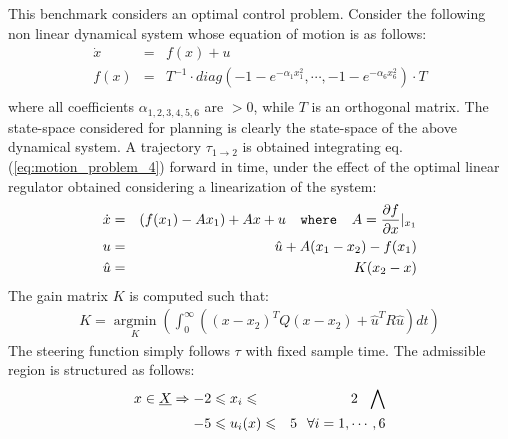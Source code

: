 This benchmark considers an optimal control problem. Consider the following non linear dynamical system whose equation of motion is as follows:
\begin{eqnarray}
\dot{x} &=& f(x) + u \label{eq:motion_problem_4} \\  
f(x) &=& T^{-1} \cdot 
diag(-1-e^{- \alpha_{1} x_1^2}, \cdots, -1-e^{- \alpha_{6} x_6^2})
\cdot T \nonumber\\
\end{eqnarray}
where all coefficients $\alpha_{1,2,3,4,5,6}$ are $>0$, while $T$ is an orthogonal matrix.
The state-space considered for planning is clearly the state-space of the above dynamical system.
A trajectory $\tau_{1 \rightarrow 2}$ is obtained integrating eq. (\ref{eq:motion_problem_4}) forward in time, under the effect of the optimal linear regulator obtained considering a linearization of the system:
\begin{eqnarray}
\dot{x} &=& \left( f(x_1) -A x_1 \right) + A x + u \texttt{\,\,\, where \,\,\,} 
A= \frac{\partial{ f }}{\partial{ x }} \vert _{x_1}  \nonumber\\
u &=& \hat{u} + A(x_1 - x_2) - f(x_1) \nonumber\\
\hat{u} &=& K (x_2 - x) 
\end{eqnarray}
The gain matrix $K$ is computed such that:
\begin{eqnarray}
K = \underset{K}{\operatorname{argmin}}\left( \int_{0}^{\infty} \left( (x-x_2)^{T} Q (x-x_2) +  \hat{u}^{T} R \hat{u} \right) dt \right)
\end{eqnarray}
The steering function simply follows $\tau$ with fixed sample time.
The admissible region is structured as follows:
\begin{eqnarray}
x \in \underline{X} \Rightarrow  -2 & \leqslant  x_i   \leqslant & 2 \texttt{\,\,\,\,} 
\bigwedge \nonumber\\
 -5 & \leqslant  u_i(x)  \leqslant & 5  \texttt{\,\,\,\,}  \forall i=1,\cdots , 6 
\end{eqnarray}


